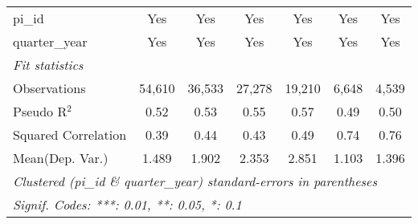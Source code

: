 \begin{tabular}{lcccccc}
   pi\_id                                                     & Yes           & Yes           & Yes           & Yes           & Yes            & Yes\\  
   quarter\_year                                              & Yes           & Yes           & Yes           & Yes           & Yes            & Yes\\  
   \midrule
   \emph{Fit statistics}\\
   Observations                                               & 54,610        & 36,533        & 27,278        & 19,210        & 6,648          & 4,539\\  
   Pseudo R$^2$                                               & 0.52          & 0.53          & 0.55          & 0.57          & 0.49           & 0.50\\  
   Squared Correlation                                        & 0.39          & 0.44          & 0.43          & 0.49          & 0.74           & 0.76\\  
Mean(Dep. Var.) & 1.489 & 1.902 & 2.353 & 2.851 & 1.103 & 1.396 \\
   \midrule \midrule
   \multicolumn{7}{l}{\emph{Clustered (pi\_id \& quarter\_year) standard-errors in parentheses}}\\
   \multicolumn{7}{l}{\emph{Signif. Codes: ***: 0.01, **: 0.05, *: 0.1}}\\
\end{tabular}
\par\endgroup
